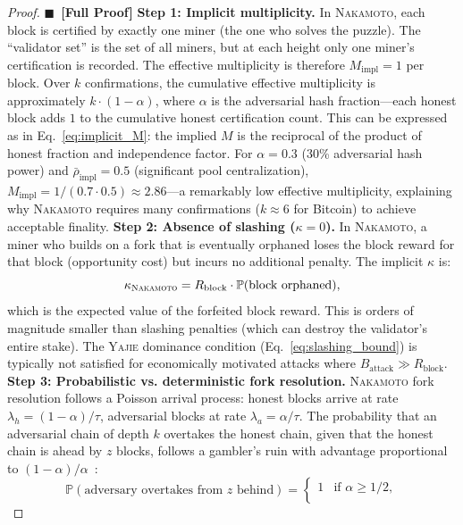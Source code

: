 \documentclass[11pt,a4paper]{article}
\theoremstyle{definition}
\newcommand{\rigorFull}[0]{$\blacksquare$~\textbf{[Full Proof]}}
\newcommand{\Yajie}{\textsc{Yajie}}
\newcommand{\Pbb}{\mathbb{P}}
\newcommand{\Nakamoto}{\textsc{Nakamoto}}
\newcommand{\PoS}{\mathrm{PoS}}
\begin{document}
\begin{proof}\rigorFull
\textbf{Step 1: Implicit multiplicity.} In \Nakamoto{}, each block is certified by exactly one miner (the one who solves the puzzle). The ``validator set'' is the set of all miners, but at each height only one miner's certification is recorded. The effective multiplicity is therefore $M_{\mathrm{impl}} = 1$ per block. Over $k$ confirmations, the cumulative effective multiplicity is approximately $k \cdot (1 - \alpha)$, where $\alpha$ is the adversarial hash fraction—each honest block adds $1$ to the cumulative honest certification count.
This can be expressed as in Eq.~\eqref{eq:implicit_M}: the implied $M$ is the reciprocal of the product of honest fraction and independence factor. For $\alpha = 0.3$ (30\% adversarial hash power) and $\bar{\rho}_{\mathrm{impl}} = 0.5$ (significant pool centralization), $M_{\mathrm{impl}} = 1 / (0.7 \cdot 0.5) \approx 2.86$—a remarkably low effective multiplicity, explaining why \Nakamoto{} requires many confirmations ($k \approx 6$ for Bitcoin) to achieve acceptable finality.
\textbf{Step 2: Absence of slashing ($\kappa = 0$).} In \Nakamoto{}, a miner who builds on a fork that is eventually orphaned loses the block reward for that block (opportunity cost) but incurs no additional penalty. The implicit $\kappa$ is:
\begin{equation}
    \kappa_{\Nakamoto} = R_{\mathrm{block}} \cdot \Pbb(\text{block orphaned}),
    \label{eq:nakamoto_kappa}
\end{equation}
which is the expected value of the forfeited block reward. This is orders of magnitude smaller than \PoS{} slashing penalties (which can destroy the validator's entire stake). The \Yajie{} dominance condition (Eq.~\ref{eq:slashing_bound}) is typically not satisfied for economically motivated attacks where $B_{\mathrm{attack}} \gg R_{\mathrm{block}}$.
\textbf{Step 3: Probabilistic vs. deterministic fork resolution.} \Nakamoto{} fork resolution follows a Poisson arrival process: honest blocks arrive at rate $\lambda_h = (1-\alpha)/\tau$, adversarial blocks at rate $\lambda_a = \alpha/\tau$. The probability that an adversarial chain of depth $k$ overtakes the honest chain, given that the honest chain is ahead by $z$ blocks, follows a gambler's ruin with advantage proportional to $(1-\alpha)/\alpha$~\cite{Nakamoto2008}:
\begin{equation}
    \Pbb(\text{adversary overtakes from $z$ behind}) = \begin{cases}
        1 & \text{if } \alpha \geq 1/2, \\

\end{cases}
\end{equation}
\end{proof}
\end{document}
